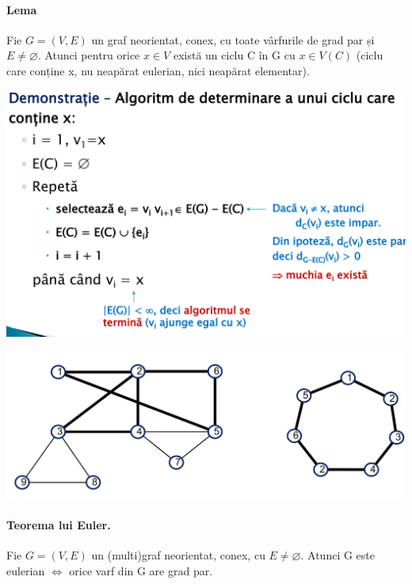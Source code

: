 \documentclass{article}
\begin{document}
\paragraph*{Lema} Fie $G=(V,E)$ un graf neorientat, conex, cu toate vârfurile de
grad par și $E \neq \varnothing$. Atunci pentru orice $x \in V$ există un ciclu C în G cu $x \in V(C)$ (ciclu care conține x, nu neapărat eulerian, nici neapărat elementar).

\begin{center}
    \includegraphics[scale=0.3]{10_grafeulerian.png}
\end{center}

\begin{center}
    \includegraphics[scale=0.3]{11_determinare_ciclueulerian.png}
\end{center}

\paragraph*{Teorema lui Euler.} Fie $G=(V, E)$ un (multi)graf neorientat, conex, cu $E \neq \varnothing$. Atunci G este eulerian $\Leftrightarrow$ orice varf din G are grad par.
\end{document}
